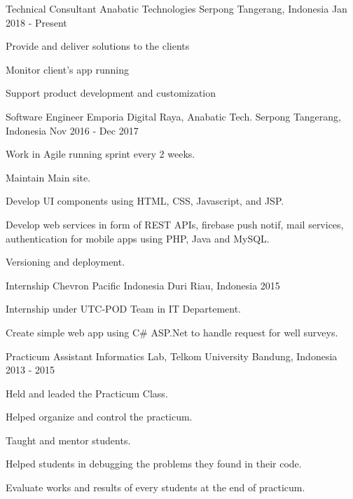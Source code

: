 \begin{cventries}
\cventry
    {Technical Consultant}
    {Anabatic Technologies}
    {Serpong Tangerang, Indonesia}
    {Jan 2018 - Present}
    {
        \begin{cvitems}
            \item {Provide and deliver solutions to the clients}
            \item {Monitor client's app running}
            \item {Support product development and customization}
        \end{cvitems}
    }


\cventry
    {Software Engineer}
    {Emporia Digital Raya, Anabatic Tech.}
    {Serpong Tangerang, Indonesia}
    {Nov 2016 - Dec 2017}
    {
        \begin{cvitems}
            \item {Work in Agile running sprint every 2 weeks.}
            \item {Maintain Main site.}
            \item {Develop UI components using HTML, CSS, Javascript, and JSP.}
            \item {Develop web services in form of REST APIs, firebase push notif, mail services, authentication for mobile apps using PHP, Java and MySQL.}
            \item {Versioning and deployment.}
        \end{cvitems}
    }


\cventry
    {Internship}
    {Chevron Pacific Indonesia}
    {Duri Riau, Indonesia}
    {2015}
    {
        \begin{cvitems}
            \item {Internship under UTC-POD Team in IT Departement.}
            \item {Create simple web app using C\# ASP.Net to handle request for well surveys.}
        \end{cvitems}
    }

    
\cventry
    {Practicum Assistant}
    {Informatics Lab, Telkom University}
    {Bandung, Indonesia}
    {2013 - 2015}
    {
        \begin{cvitems}
            \item {Held and leaded the Practicum Class.}
            \item {Helped organize and control the practicum.}
            \item {Taught and mentor students.}
            \item {Helped students in debugging the problems they found in their code.}
            \item {Evaluate works and results of every students at the end of practicum.}
        \end{cvitems}
    }
\end{cventries}
